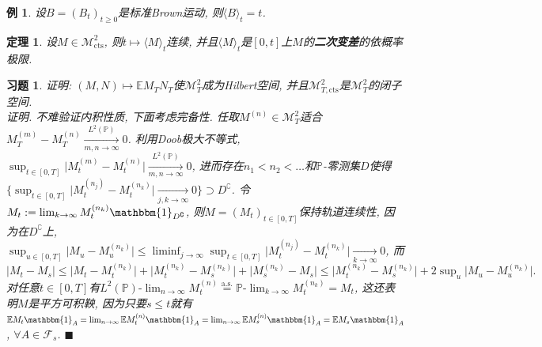 \documentclass{ctexart}
\theoremstyle{definition}
\theoremstyle{remark}
\theoremstyle{plain}
\newtheorem{Thm}[Def]{定理}
\newtheorem{Eg}[Def]{例}
\newtheorem{Ex}{习题}[section]
\newenvironment{Prf}{\vspace{1ex}\textbf{\\}{\color{red}\textit{证明}}.\normalfont}{\color{red}\hfill$\blacksquare$\vspace{1ex}\par}
\newcommand{\1}{\mathbbm{1}}				%
\newcommand{\as}{\mathrm{a.s.}}				%
\renewcommand{\P}{\mathbb{P}}				%
\newcommand{\E}{\mathbb{E}}					%
\newcommand{\agp}[1]{\langle #1 \rangle}	%
\newcommand{\abs}[1]{\lvert#1\rvert}			%
\begin{document}
\begin{Eg}
设$B = (B_{t})_{t \ge 0}$是标准Brown运动, 则$\agp{B}_{t} = t$.
\end{Eg}

\begin{Thm}\label{Thm:<M>=[M]_for_M_cts}
设$M \in \mathcal{M}^{2}_{\mathrm{cts}}$, 则$t \mapsto \agp{M}_{t}$连续, 并且$\agp{M}_{t}$是$[0,t]$上$M$的\textbf{二次变差}的依概率极限.
\end{Thm}


\begin{Ex}
证明: $(M,N) \mapsto \E M_{T}N_{T}$使$\mathcal{M}^{2}_{T}$成为Hilbert空间, 并且$\mathcal{M}^{2}_{T,\mathrm{cts}}$是$\mathcal{M}^{2}_{T}$的闭子空间.
\begin{Prf}
不难验证内积性质, 下面考虑完备性. 任取$M^{(n)} \in \mathcal{M}^{2}_{T}$适合$M^{(m)}_{T}-M^{(n)}_{T} \xrightarrow[m,n \to \infty]{L^{2}(\P)} 0$. 利用Doob极大不等式, $\sup_{t \in [0,T]} \abs{M^{(m)}_{t}-M^{(n)}_{t}} \xrightarrow[m,n \to \infty]{L^{2}(\P)} 0$, 进而存在$n_{1} < n_{2} < \dots$和$\P$-零测集$D$使得$\big\{ \sup_{t \in [0,T]} \abs{M^{(n_{j})}_{t}-M^{(n_{k})}_{t}} \xrightarrow[j,k \to \infty]{} 0 \big\} \supset D^{\complement}$. 令$M_{t} := \lim_{k\to\infty} M^{(n_{k})}_{t} \1_{D^\complement}$, 则$M = (M_{t})_{t \in [0,T]}$保持轨道连续性, 因为在$D^\complement$上, $\sup_{u \in [0,T]} \abs{M_{u}-M_{u}^{(n_{k})}} \le \liminf_{j\to\infty} \sup_{t \in [0,T]} \abs{M_{t}^{(n_{j})}-M_{t}^{(n_{k})}} \xrightarrow[k\to\infty]{} 0$, 而
\[ \abs{M_{t}-M_{s}} \le \abs{M_{t}-M_{t}^{(n_{k})}} + \abs{M_{t}^{(n_{k})}-M_{s}^{(n_{k})}} + \abs{M_{s}^{(n_{k})}-M_{s}} \le \abs{M_{t}^{(n_{k})}-M_{s}^{(n_{k})}} + 2 \sup\nolimits_{u} \abs{M_{u}-M_{u}^{(n_{k})}} . \]
对任意$t \in [0,T]$有$L^{2}(\P)\text{-}\lim_{n\to\infty}M^{(n)}_{t} \stackrel{\as}{=} \P\text{-}\lim_{k\to\infty}M^{(n_{k})}_{t} = M_{t}$, 这还表明$M$是平方可积鞅, 因为只要$s \le t$就有$\E M_{t}\1_{A} = \lim_{n\to\infty} \E M_{t}^{(n)}\1_{A} = \lim_{n\to\infty} \E M_{s}^{(n)}\1_{A} = \E M_{s}\1_{A}$, $\forall A \in \mathscr{F}_{s}$.
\end{Prf}
\end{Ex}
\end{document}
